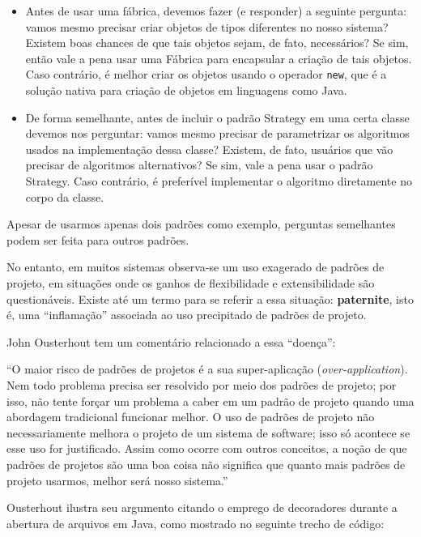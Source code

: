 \documentclass[
  11pt,
  twoside]{book}
\newcommand{\passthrough}[1]{#1}
\renewenvironment{quote}{\centering \vspace{1.5ex} \begin{tcolorbox}[colback=backcolor, width=4.9in]}{\end{tcolorbox}}
\begin{document}
\begin{itemize}
\item
  Antes de usar uma fábrica, devemos fazer (e responder) a seguinte
  pergunta: vamos mesmo precisar criar objetos de tipos diferentes no
  nosso sistema? Existem boas chances de que tais objetos sejam, de
  fato, necessários? Se sim, então vale a pena usar uma Fábrica para
  encapsular a criação de tais objetos. Caso contrário, é melhor criar
  os objetos usando o operador \passthrough{\lstinline!new!}, que é a
  solução nativa para criação de objetos em linguagens como Java.
\item
  De forma semelhante, antes de incluir o padrão Strategy em uma certa
  classe devemos nos perguntar: vamos mesmo precisar de parametrizar os
  algoritmos usados na implementação dessa classe? Existem, de fato,
  usuários que vão precisar de algoritmos alternativos? Se sim, vale a
  pena usar o padrão Strategy. Caso contrário, é preferível implementar
  o algoritmo diretamente no corpo da classe.
\end{itemize}

Apesar de usarmos apenas dois padrões como exemplo, perguntas
semelhantes podem ser feita para outros padrões.

No entanto, em muitos sistemas observa-se um uso exagerado de padrões de
projeto, em situações onde os ganhos de flexibilidade e extensibilidade
são questionáveis. Existe até um termo para se referir a essa situação:
\textbf{paternite}, isto é, uma ``inflamação'' associada ao uso
precipitado de padrões de projeto.

 John Ousterhout tem um comentário relacionado a
essa ``doença'':

\begin{quote}
``O maior risco de padrões de projetos é a sua super-aplicação
(\emph{over-application}). Nem todo problema precisa ser resolvido por
meio dos padrões de projeto; por isso, não tente forçar um problema a
caber em um padrão de projeto quando uma abordagem tradicional funcionar
melhor. O uso de padrões de projeto não necessariamente melhora o
projeto de um sistema de software; isso só acontece se esse uso for
justificado. Assim como ocorre com outros conceitos, a noção de que
padrões de projetos são uma boa coisa não significa que quanto mais
padrões de projeto usarmos, melhor será nosso sistema.''
\end{quote}

Ousterhout ilustra seu argumento citando o emprego de decoradores
durante a abertura de arquivos em Java, como mostrado no seguinte trecho
de código:
\end{document}

